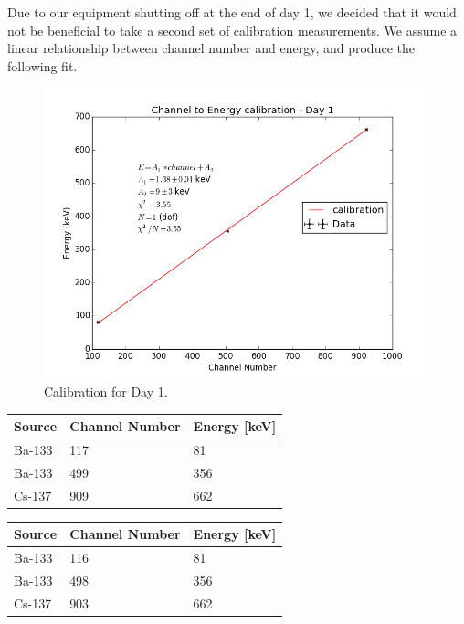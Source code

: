 \documentclass{article}
\begin{document}
Due to our equipment shutting off at the end of day 1, we decided that it would not be beneficial to take a second set of calibration measurements. We assume a linear relationship between channel number and energy, and produce the following fit.

\begin{figure}[!htb]
	\centering
	\includegraphics[scale=.75]{plots/cal1.png}
  	\caption{Calibration for Day 1.} 
 	\label{cal1}
\end{figure}

\begin{center}
    \centering
     \label{tab:title} 
    \begin{tabular}{| l | l | l |}
    \hline
    Source & Channel Number & Energy [keV] \\ \hline
    Ba-133 & 117 & 81 \\ \hline
    Ba-133 & 499 & 356 \\ \hline
    Cs-137 & 909 & 662 \\ \hline
    \end{tabular}
\end{center}

\begin{center}
    \centering
     \label{tab:title} 
    \begin{tabular}{| l | l | l |}
    \hline
    Source & Channel Number & Energy [keV] \\ \hline
    Ba-133 & 116 & 81 \\ \hline
    Ba-133 & 498 & 356 \\ \hline
    Cs-137 & 903 & 662 \\ \hline
    \end{tabular}
\end{center}
\end{document}
